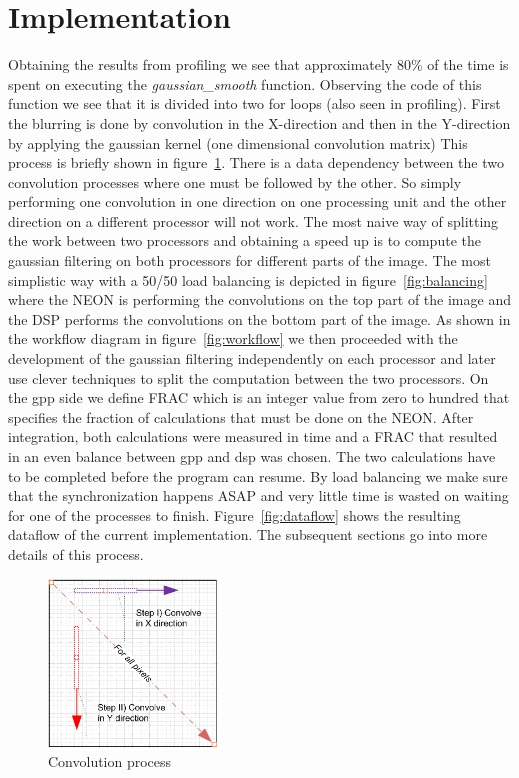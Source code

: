 \section{Implementation}
Obtaining the results from profiling we see that approximately 80\% of the time is spent on executing the \textit{gaussian\_smooth} function. Observing the code of this function we see that it is divided into two for loops (also seen in profiling).
First the blurring is done by convolution in the X-direction and then in the Y-direction by applying the gaussian kernel (one dimensional convolution matrix) This process is briefly shown in figure~\ref{fig:convolution}. There is a data dependency between the two convolution processes where one must be followed by the other. So simply performing one convolution in one direction on one processing unit and the other direction on a different processor will not work. The most naive way of splitting the work between two processors and obtaining a speed up is to compute the gaussian filtering on both processors for different parts of the image. The most simplistic way with a 50/50 load balancing is depicted in figure~\ref{fig:balancing} where the NEON is performing the convolutions on the top part of the image and the DSP performs the convolutions on the bottom part of the image. As shown in the workflow diagram in figure~\ref{fig:workflow} we then proceeded with the development of the gaussian filtering independently on each processor and later use clever techniques to split the computation between the two processors. On the gpp side we define FRAC which is an integer value from zero to hundred that specifies the fraction of calculations that must be done on the NEON. After integration, both calculations were measured in time and a FRAC that resulted in an even balance between gpp and dsp was chosen. The two calculations have to be completed before the program can resume. By load balancing we make sure that the synchronization happens ASAP and very little time is wasted on waiting for one of the processes to finish. Figure~\ref{fig:dataflow} shows the resulting dataflow of the current implementation.
 The subsequent sections go into more details of this process.

\begin{figure}
\includegraphics[width=0.4\textwidth]{drawings/gaussian_general}
\caption{Convolution process}
\label{fig:convolution}
\end{figure}


